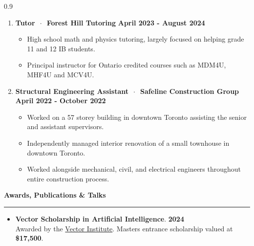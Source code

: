 \documentclass{article}
\begin{document}
\begin{spacing}{0.9}
\begin{enumerate}[itemsep=0.1em, parsep=0.1em, topsep=0.1em]
    \item \textbf{Tutor} $ \ \cdot \ $ \small{\textbf{Forest Hill Tutoring}} \hspace{\fill} \textbf{April 2023 - August 2024}\\
    \small{ 
        \begin{itemize}[itemsep=0.1pt,parsep=0.1pt, topsep=0.1pt]
            \item High school math and physics tutoring, largely focused on helping grade 11 and 12 IB students.
            \item Principal instructor for Ontario credited courses such as MDM4U, MHF4U and MCV4U.
        \end{itemize}
    }
    \normalsize

    \item \textbf{Structural Engineering Assistant} $ \ \cdot \ $ \small{\textbf{Safeline Construction Group}} \hspace{\fill} \textbf{April 2022 - October 2022}\\
    \small{ 
        \begin{itemize}[itemsep=0.1pt,parsep=0.1pt, topsep=0.1pt]
            \item Worked on a 57 storey building in downtown Toronto assisting the senior and assistant supervisors.
            \item Independently managed interior renovation of a small townhouse in downtown Toronto.
            \item Worked alongside mechanical, civil, and electrical engineers throughout entire construction process.
        \end{itemize}
    }
\end{enumerate}

\normalsize
\LARGE{\textbf{Awards, Publications \& Talks}}\normalsize \\[0.10cm]
\vspace{-0.2cm}
\noindent\rule{18.25cm}{0.7pt}
\small{
\begin{itemize}[itemsep=0.1em, parsep=0.2em, topsep=0.1em]
    \item \textbf{Vector Scholarship in Artificial Intelligence}. \hspace{\fill} \textbf{2024}\\
    Awarded by the \href{https://vectorinstitute.ai/programs/scholarship/}{\color{blue} Vector Institute}. Masters entrance scholarship valued at \textbf{\$17,500}.


\end{itemize}}
\end{spacing}
\end{document}

